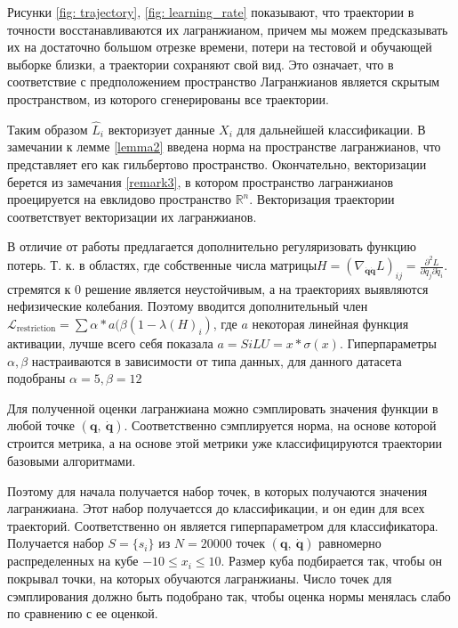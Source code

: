 \documentclass[12pt, twoside]{article}
\begin{document}
Рисунки \ref{fig: trajectory}, \ref{fig: learning_rate} показывают, что траектории в точности восстанавливаются их лагранжианом, причем мы можем предсказывать их на достаточно большом отрезке времени, потери на тестовой и обучающей выборке близки, а траектории сохраняют свой вид. Это означает, что в соответствие с предположением пространство Лагранжианов является скрытым пространством, из которого сгенерированы все траектории.

Таким образом $\hat{L}_i$ векторизует данные $X_i$ для дальнейшей классификации. В замечании к лемме \ref{lemma2} введена норма на пространстве лагранжианов, что представляет его как гильбертово пространство. Окончательно, векторизации берется из замечания \ref{remark3}, в котором пространство лагранжианов проецируется на евклидово пространство $\mathbb{R}^n$. Векторизация траектории соответствует векторизации их лагранжианов.

В отличие от работы \cite{article} предлагается дополнительно регуляризовать функцию потерь. Т. к. в областях, где собственные числа матрицы$H = \left(\nabla_{\dot{\mathbf{q}}\dot{\mathbf{q}}} L\right)_{i j}=\frac{\partial^{2} L}{\partial \dot{q_{j}} \partial \dot{q}_{i}}.$ стремятся к 0 решение является неустойчивым, а на траекториях выявляются нефизические колебания. Поэтому вводится дополнительный член $\mathcal{L}_\text{restriction} =  \sum \alpha * a(\beta(1 - \lambda(H)_i)$, где $a$ некоторая линейная функция активации, лучше всего себя показала $a = SiLU = x*\sigma(x)$. Гиперпараметры $\alpha, \beta$ настраиваются в зависимости от типа данных, для данного датасета подобраны $\alpha = 5, \beta = 12$

Для полученной оценки лагранжиана можно сэмплировать значения функции в любой точке $(\mathbf{q},\ \mathbf{\dot{q}})$. Соответственно сэмплируется норма, на основе которой строится метрика, а на основе этой метрики уже классифицируются траектории базовыми алгоритмами.

Поэтому для начала получается набор точек, в которых получаются значения лагранжиана. Этот набор получаетсся до классификации, и он един для всех траекторий. Соответственно он является гиперпараметром для классификатора. Получается набор $S = \{s_i\}$ из $N = 20000$ точек $(\mathbf{q},\ \mathbf{\dot{q}})$ равномерно распределенных на кубе $-10 \le {x_i} \le 10$. Размер куба подбирается так, чтобы он покрывал точки, на которых обучаются лагранжианы. Число точек для сэмплирования должно быть подобрано так, чтобы оценка нормы менялась слабо по сравнению с ее оценкой.
\end{document}
